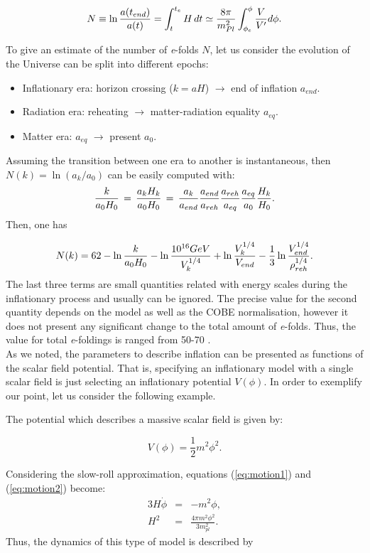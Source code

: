 \documentclass{rmaa}
\def\beq{\begin{equation}}
\def\eeq{\end{equation}}
\def\bea{\begin{eqnarray}}
\def\eea{\end{eqnarray}}
\begin{document}
\begin{equation} \label{eq:N}
N \equiv \ln {a(t_{end}) \over a(t)}=
\int_{t}^{t_e}{H\,dt} \simeq 
{8\pi \over m^2_{Pl}} \int_{\phi_e}^{\phi} {V \over V'} d\phi .
\end{equation}

\noindent
To give an estimate of the number of \textit{e}-folds $N$, let us consider the evolution of the Universe 
can be split into different epochs:

\begin{itemize}
\item Inflationary era: horizon crossing ($k=aH$) $\to$ end of inflation $a_{end}$.
\item Radiation era: reheating $\to$ matter-radiation equality $a_{eq}$.
\item Matter era: $a_{eq}$ $\to$ present $a_{0}$.
\end{itemize}

\noindent
Assuming the transition between one era to another is instantaneous, then $N(k)= \ln ({a_k / a_0})$
can be easily computed with:
$$ 
{k\over a_0 H_0}\,=\,{a_k H_k \over a_0 H_0}\,=\,{a_k\over a_{end}}{a_{end}\over a_{reh}}
{a_{reh}\over a_{eq}}{a_{eq} \over a_0}{H_k\over H_0}.
$$
Then, one has \citep{LiddleLyth}

$$
N(k)=62-\ln{k \over a_0 H_0}-\ln{10^{16} GeV \over V_k^{1/4}}+\ln{V_k^{1/4} \over V_{end}}-
{1 \over 3}\ln{V_{end}^{1/4} \over \rho_{reh}^{1/4}}.
$$
%
The last three terms are small quantities related with energy scales during the inflationary 
process and usually can be ignored.
The precise value for the second quantity depends on the model as well as the 
COBE normalisation, however it does not present any significant change to the total 
amount of \textit{e}-folds. Thus, the value for total \textit{e}-foldings is ranged from 50-70 \citep{Lyth}.
\\

As we noted, the parameters to describe inflation can be presented
as functions of the scalar field potential. That is, specifying an inflationary 
model with a single scalar field is just selecting an inflationary potential $V(\phi)$. 
In order to exemplify our point, let us consider the following example.


The potential which describes a massive scalar field is given by:

\beq \label{eq:mass}
V(\phi)= \frac{1}{2}m^2 \phi^2.
\eeq

\noindent
Considering the slow-roll approximation, equations (\ref{eq:motion1}) and (\ref{eq:motion2}) become:
%
\bea
3H\dot \phi &=& -m^2 \phi, \\
H^2 &=& \frac{4\pi m^2 \phi^2}{3 m_{pl}^2}.\nonumber
\eea
\noindent
Thus, the dynamics of this type of model is described by
\end{document}
